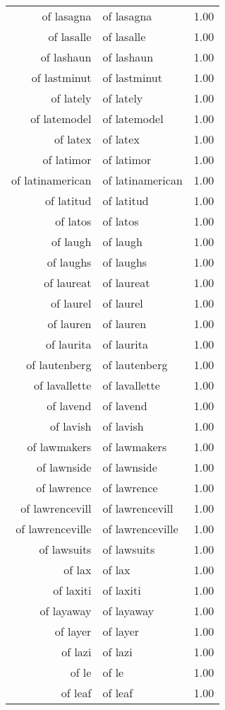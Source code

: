 \begin{table}[ht]
\begin{tabular}{rlr}
  of lasagna & of lasagna & 1.00 \\ 
  of lasalle & of lasalle & 1.00 \\ 
  of lashaun & of lashaun & 1.00 \\ 
  of lastminut & of lastminut & 1.00 \\ 
  of lately & of lately & 1.00 \\ 
  of latemodel & of latemodel & 1.00 \\ 
  of latex & of latex & 1.00 \\ 
  of latimor & of latimor & 1.00 \\ 
  of latinamerican & of latinamerican & 1.00 \\ 
  of latitud & of latitud & 1.00 \\ 
  of latos & of latos & 1.00 \\ 
  of laugh & of laugh & 1.00 \\ 
  of laughs & of laughs & 1.00 \\ 
  of laureat & of laureat & 1.00 \\ 
  of laurel & of laurel & 1.00 \\ 
  of lauren & of lauren & 1.00 \\ 
  of laurita & of laurita & 1.00 \\ 
  of lautenberg & of lautenberg & 1.00 \\ 
  of lavallette & of lavallette & 1.00 \\ 
  of lavend & of lavend & 1.00 \\ 
  of lavish & of lavish & 1.00 \\ 
  of lawmakers & of lawmakers & 1.00 \\ 
  of lawnside & of lawnside & 1.00 \\ 
  of lawrence & of lawrence & 1.00 \\ 
  of lawrencevill & of lawrencevill & 1.00 \\ 
  of lawrenceville & of lawrenceville & 1.00 \\ 
  of lawsuits & of lawsuits & 1.00 \\ 
  of lax & of lax & 1.00 \\ 
  of laxiti & of laxiti & 1.00 \\ 
  of layaway & of layaway & 1.00 \\ 
  of layer & of layer & 1.00 \\ 
  of lazi & of lazi & 1.00 \\ 
  of le & of le & 1.00 \\ 
  of leaf & of leaf & 1.00 \\ 

\end{tabular}
\end{table}
